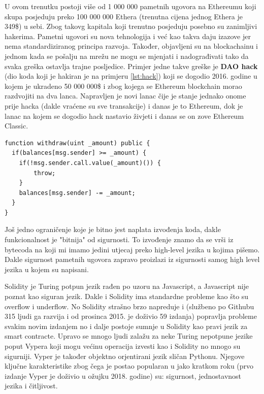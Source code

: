 \documentclass[a4paper,oneside,12pt]{memoir} %
\begin{document}
U ovom trenutku postoji više od 1 000 000 pametnih ugovora na Ethereumu koji skupa posjeduju preko 100 000 000 Ethera (trenutna cijena jednog Ethera je 349\$) u sebi. Zbog takovg kapitala koji trenutno posjeduju posebno su zanimljivi hakerima. Pametni ugovori su nova tehnologija i već kao takva daju izazove jer nema standardiziranog principa razvoja. Također, objavljeni su na blockachainu i jednom kada se pošalju na mrežu ne mogu se mjenjati i nadograđivati tako da svaka greška ostavlja trajne posljedice. Primjer jedne takve greške je \textbf{DAO hack} (dio koda koji je hakiran je na primjeru \ref{lst:hack}) koji se dogodio 2016. godine u kojem je ukradeno 50 000 000\$ i zbog kojega se Ethereum blockchain morao razdvojiti na dva lanca. Napravljen je novi lanac čije je stanje jednako onome prije hacka (dakle vraćene su sve transakcije) i danas je to Ethereum, dok je lanac na kojem se dogodio hack nastavio živjeti i danas se on zove Ethereum Classic.

\begin{minipage}{\linewidth}
\begin{lstlisting}[caption = Ukratko: DAO je jedna od drugih valuta na Ethereumu koja je imala svoju protuvrijednost u Etheru. Funkcija witdraw jednostavno povlači sredstva koje korisnik ima na pametnom ugovoru. No što ako damo hrpu zahtjeva odjednom? Tada se sredstva konstantno prebacuju na račun korisnika no na pametnom ugovoru se nije uspio smanjiti broj jer nije postojao nikakav mehanizam zaštite., language=solidity, label={lst:hack}]
function withdraw(uint _amount) public {
  if(balances[msg.sender] >= _amount) {
    if(!msg.sender.call.value(_amount)()) { 
        throw;
    }
    balances[msg.sender] -= _amount;
  }
}
\end{lstlisting}
\end{minipage}

Još jedno ograničenje koje je bitno jest naplata izvođenja koda, dakle funkcionalnost je "bitnija" od sigurnosti. To izvođenje znamo da se vrši iz bytecoda na koji mi imamo jedini utjecaj preko high-level jezika u kojima pišemo. Dakle sigurnost pametnih ugovora zapravo proizlazi iz sigurnosti samog high level jezika u kojem su napisani.

Solidity je Turing potpun jezik rađen po uzoru na Javascript, a Javascript nije poznat kao siguran jezik. Dakle i Solidity ima standardne probleme kao što su overflow i underflow. No Solidity strašno brzo napreduje i (službeno po Githubu 315 ljudi ga razvija i od prosinca 2015. je doživio 59 izdanja) popravlja probleme svakim novim izdanjem no i dalje postoje sumnje u Solidity kao pravi jezik za smart contracte. Upravo se mnogo ljudi zalažu za neke Turing nepotpune jezike poput Vypera koji mogu većinu operacija izvesti kao i Solidity no mnogo su sigurniji. Vyper je također objektno orjentirani jezik sličan Pythonu. Njegove ključne karakteristike zbog čega je postao popularan u jako kratkom roku (prvo izdanje Vyper je doživio u ožujku 2018. godine) su: sigurnost, jednostavnost jezika i čitljivost. 
\end{document}
